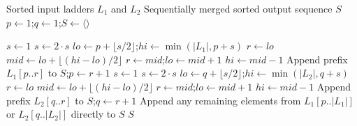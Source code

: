 \documentclass{ieeeaccess}
\theoremstyle{plain}
\theoremstyle{definition}
\begin{document}
\begin{algorithm}[t]
\caption{\textsc{TwoWayGalloping}$(L_1, L_2)$}
\label{alg:gallop}
\begin{algorithmic}[1]
\Require Sorted input ladders $L_1$ and $L_2$
\Ensure Sequentially merged sorted output sequence $S$
\State $p \gets 1$;\quad $q \gets 1$;\quad $S \gets \langle\rangle$

        \State $s \gets 1$ 
            \State $s \gets 2 \cdot s$
        \EndWhile
        \State $\mathit{lo} \gets p + \lfloor s/2 \rfloor$;\quad $\mathit{hi} \gets \min(|L_1|, p + s)$
        \State $r \gets \mathit{lo}$ 
            \State $\mathit{mid} \gets \mathit{lo} + \lfloor (\mathit{hi} - \mathit{lo}) / 2 \rfloor$
                \State $r \gets \mathit{mid}$;\quad $\mathit{lo} \gets \mathit{mid} + 1$
            \Else
                \State $\mathit{hi} \gets \mathit{mid} - 1$
            \EndIf
        \EndWhile
        \State Append prefix $L_1[p..r]$ to $S$;\quad $p \gets r + 1$
    \Else
        \State $s \gets 1$ 
            \State $s \gets 2 \cdot s$
        \EndWhile
        \State $\mathit{lo} \gets q + \lfloor s/2 \rfloor$;\quad $\mathit{hi} \gets \min(|L_2|, q + s)$
        \State $r \gets \mathit{lo}$
            \State $\mathit{mid} \gets \mathit{lo} + \lfloor (\mathit{hi} - \mathit{lo}) / 2 \rfloor$
                \State $r \gets \mathit{mid}$;\quad $\mathit{lo} \gets \mathit{mid} + 1$
            \Else
                \State $\mathit{hi} \gets \mathit{mid} - 1$
            \EndIf
        \EndWhile
        \State Append prefix $L_2[q..r]$ to $S$;\quad $q \gets r + 1$
    \EndIf
\EndWhile
\State Append any remaining elements from $L_1[p..|L_1|]$ or $L_2[q..|L_2|]$ directly to $S$
\State \Return $S$
\end{algorithmic}
\end{algorithm}
\end{document}
